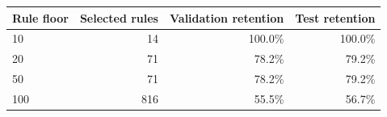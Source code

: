 \begin{tabular}{lrrr}
\toprule
Rule floor & Selected rules & Validation retention & Test retention \\
\midrule
10 & 14 & 100.0\% & 100.0\% \\
20 & 71 & 78.2\% & 79.2\% \\
50 & 71 & 78.2\% & 79.2\% \\
100 & 816 & 55.5\% & 56.7\% \\
\bottomrule
\end{tabular}

